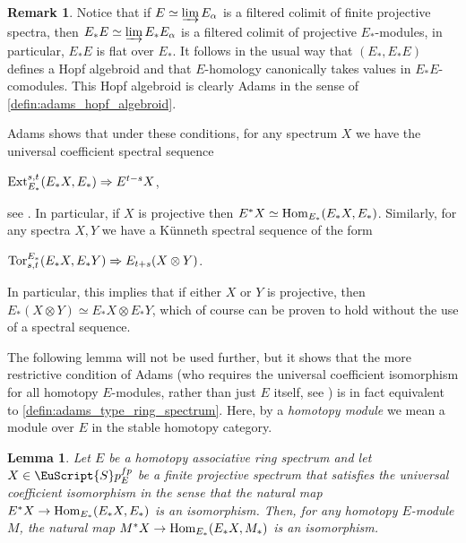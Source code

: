 \documentclass[oneside,a4paper]{amsart}
\newcommand{\euscr}[1]{\EuScript{#1}} %
\newcommand{\Hom}{\textnormal{Hom}} %
\newcommand{\spectra}{\euscr{S}p} %
\theoremstyle{plain}
\newtheorem{lemma}[thm]{Lemma}
\theoremstyle{definition}
\newtheorem{rem}[thm]{Remark}
\theoremstyle{remark}
\begin{document}
\begin{rem}
\label{rem:adams_ring_spectrum_is_flat}
Notice that if $E \simeq \varinjlim E_{\alpha}$ is a filtered colimit of finite projective spectra, then $E_{*}E \simeq \varinjlim E_{*} E_{\alpha}$ is a filtered colimit of projective $E_{*}$-modules, in particular, $E_{*}E$ is flat over $E_{*}$. It follows in the usual way that $(E_{*}, E_{*}E)$ defines a Hopf algebroid and that $E$-homology canonically takes values in $E_{*}E$-comodules. This Hopf algebroid is clearly Adams in the sense of \cref{defin:adams_hopf_algebroid}.
\end{rem}
Adams shows that under these conditions, for any spectrum $X$ we have the universal coefficient spectral sequence

\begin{center}
$\textnormal{Ext}^{s, t}_{E_{*}}(E_{*}X, E_{*}) \Rightarrow E^{t-s}X$,
\end{center}
see \cite[III.13]{adams1995stable}. In particular, if $X$ is projective then $E^{*}X \simeq \Hom_{E_{*}}(E_{*}X, E_{*})$. Similarly, for any spectra $X, Y$ we have a K\"{u}nneth spectral sequence of the form

\begin{center}
$\textnormal{Tor}_{s, t}^{E_{*}}(E_{*}X, E_{*}Y) \Rightarrow E_{t+s}(X \otimes Y)$.
\end{center}
In particular, this implies that if either $X$ or $Y$ is projective, then $E_{*}(X \otimes Y) \simeq E_{*}X \otimes E_{*} Y$, which of course can be proven to hold without the use of a spectral sequence. 


The following lemma will not be used further, but it shows that the more restrictive condition of Adams (who requires the universal coefficient isomorphism for all homotopy $E$-modules, rather than just $E$ itself, see \cite[Condition 13.3]{adams1995stable}) is in fact equivalent to \cref{defin:adams_type_ring_spectrum}. Here, by a \emph{homotopy module} we mean a module over $E$ in the stable homotopy category. 
\begin{lemma}
\label{lemma:kunneth_for_all_homotopy_modules}
Let $E$ be a homotopy associative ring spectrum and let $X \in \spectra_{E}^{fp}$ be a finite projective spectrum that satisfies the universal coefficient isomorphism in the sense that the natural map $E^{*}X \rightarrow \Hom_{E_{*}}(E_{*}X, E_{*})$ is an isomorphism. Then, for any homotopy $E$-module $M$, the natural map $M^{*}X \rightarrow \Hom_{E_{*}}(E_{*}X, M_{*})$ is an isomorphism. 
\end{lemma}
\end{document}
